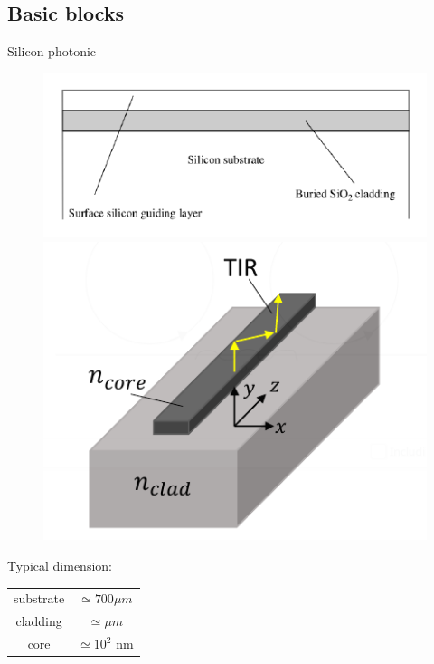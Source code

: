 \documentclass{beamer}
\begin{document}
\subsection{Basic blocks}
\begin{frame}[plain]{Silicon photonic}
\begin{figure}[H]
\centering
\begin{minipage}{.5\textwidth}
\centering
\includegraphics[width =\textwidth]{SOIstructure}
\end{minipage}%
\begin{minipage}{.5\textwidth}
\centering
\includegraphics[width =.7\textwidth]{slab}
\end{minipage}
\end{figure}
\centering
Typical dimension: %
\begin{tabular}{cc}
            substrate & $\simeq 700 \mu m$\\

             cladding & $\simeq \mu m$\\

            core & $\simeq 10^2 $ nm
        \end{tabular}

\end{frame}
\end{document}
